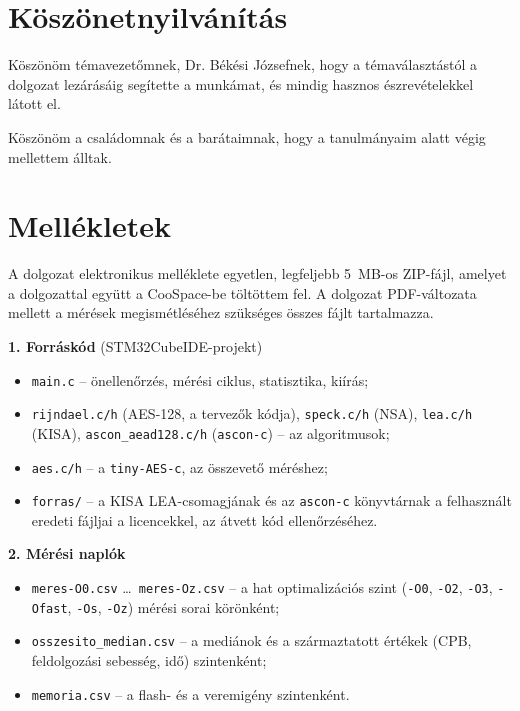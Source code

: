 \documentclass[a4paper,12pt]{report}
\theoremstyle{definition}
\theoremstyle{remark}
\begin{document}
\chapter*{Köszönetnyilvánítás}

Köszönöm témavezetőmnek, Dr. Békési Józsefnek, hogy a témaválasztástól a dolgozat lezárásáig segítette a munkámat, és mindig hasznos észrevételekkel látott el.

Köszönöm a családomnak és a barátaimnak, hogy a tanulmányaim alatt végig mellettem álltak.

\chapter*{Mellékletek}

A dolgozat elektronikus melléklete egyetlen, legfeljebb 5~MB-os ZIP-fájl, amelyet a dolgozattal együtt a CooSpace-be töltöttem fel. A dolgozat PDF-változata mellett a mérések megismétléséhez szükséges összes fájlt tartalmazza.

\medskip
\noindent\textbf{1. Forráskód} (STM32CubeIDE-projekt)
\begin{itemize}
	\item \texttt{main.c} -- önellenőrzés, mérési ciklus, statisztika, kiírás;
	\item \texttt{rijndael.c/h} (AES-128, a tervezők kódja), \texttt{speck.c/h} (NSA), \texttt{lea.c/h} (KISA), \texttt{ascon\_aead128.c/h} (\texttt{ascon-c}) -- az algoritmusok;
	\item \texttt{aes.c/h} -- a \texttt{tiny-AES-c}, az összevető méréshez;
	\item \texttt{forras/} -- a KISA LEA-csomagjának és az \texttt{ascon-c} könyvtárnak a felhasznált eredeti fájljai a licencekkel, az átvett kód ellenőrzéséhez.
\end{itemize}

\noindent\textbf{2. Mérési naplók}
\begin{itemize}
	\item \texttt{meres-O0.csv} \ldots\ \texttt{meres-Oz.csv} -- a hat optimalizációs szint (\texttt{-O0}, \texttt{-O2}, \texttt{-O3}, \texttt{-Ofast}, \texttt{-Os}, \texttt{-Oz}) mérési sorai körönként;
	\item \texttt{osszesito\_median.csv} -- a mediánok és a származtatott értékek (CPB, feldolgozási sebesség, idő) szintenként;
	\item \texttt{memoria.csv} -- a flash- és a veremigény szintenként.
\end{itemize}
\end{document}

